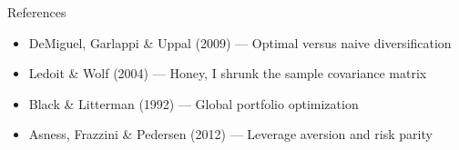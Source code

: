 \documentclass[aspectratio=169,10pt]{beamer}
\begin{document}
\begin{frame}{References}

\small
\begin{itemize}
\item DeMiguel, Garlappi \& Uppal (2009) --- Optimal versus naive diversification
\item Ledoit \& Wolf (2004) --- Honey, I shrunk the sample covariance matrix
\item Black \& Litterman (1992) --- Global portfolio optimization
\item Asness, Frazzini \& Pedersen (2012) --- Leverage aversion and risk parity
\end{itemize}

\end{frame}
\end{document}
